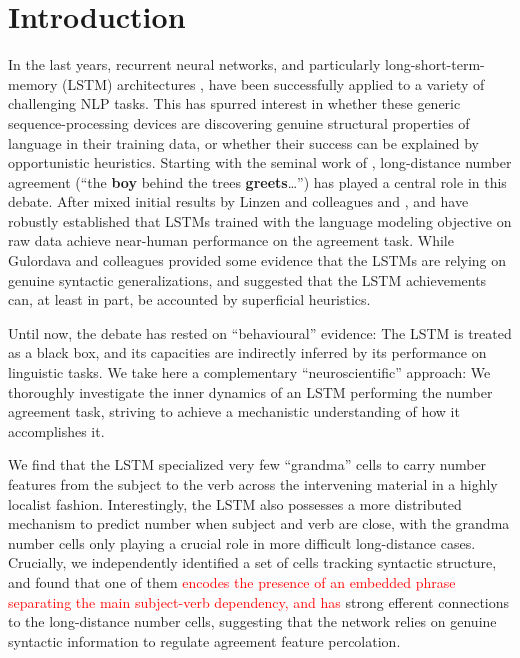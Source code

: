 \section{Introduction}

In the last years, recurrent neural networks, and particularly
long-short-term-memory (LSTM) architectures
\cite{Hochreiter:Schmidhuber:1997}, have been successfully applied to
a variety of challenging NLP tasks. This has spurred interest in
whether these generic sequence-processing devices are discovering
genuine structural properties of language in their training data, or
whether their success can be explained by opportunistic
heuristics. Starting with the seminal work of
, long-distance number agreement (``the
\textbf{boy} behind the trees \textbf{greets}\ldots'') has played a
central role in this debate. After mixed initial results by Linzen and
colleagues and ,
 and  have
robustly established that LSTMs trained with the language modeling
objective on raw data achieve near-human performance on the
agreement task. While Gulordava and colleagues provided some evidence that the
LSTMs are relying on genuine syntactic generalizations,
 and 
suggested that the LSTM achievements can, at least in part, be
accounted by superficial heuristics.

Until now, the debate has rested on ``behavioural'' evidence: The
LSTM is treated as a black box, and its capacities are indirectly
inferred by its performance on linguistic tasks. We take here a
complementary ``neuroscientific'' approach: We thoroughly investigate
the inner dynamics of an LSTM performing the number agreement task,
striving to achieve a mechanistic understanding of how it accomplishes
it.

We find that the LSTM specialized very few ``grandma'' cells
\cite{Bowers:2009} to carry number features from the subject to the
verb across the intervening material in a highly localist
fashion. Interestingly, the LSTM also possesses a more distributed
mechanism to predict number when subject and verb are close, with the
grandma number cells only playing a crucial role in more difficult
long-distance cases. Crucially, we independently identified a set of
cells tracking syntactic structure, and found that one of them \textcolor{red}{encodes the presence of an embedded phrase separating the main subject-verb dependency, and has} strong efferent connections to the long-distance number cells,
suggesting that the network relies on genuine syntactic information to
regulate agreement feature percolation.

